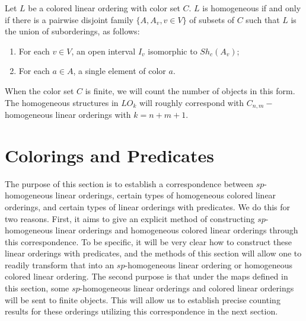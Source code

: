 \documentclass[11pt]{amsart}
\theoremstyle{definition}
\begin{document}
\begin{lemma}
Let $L$ be a colored linear ordering with color set $C$.
$L$ is homogeneous if and only if there is a pairwise disjoint family $\{A,A_v, v \in V\}$ of subsets of $C$ such that $L$ is the union of suborderings, as follows: 

\begin{enumerate}
\item For each $v \in V$, an open interval $I_v$ isomorphic to $Sh_c(A_v)$;

\item For each $a \in A$, a single element of color $a$.
\end{enumerate}
\end{lemma}

When the color set $C$ is finite, we will count the number of objects in this form.
The homogeneous structures in $LO_k$ will roughly correspond with $C_{n,m}-$homogeneous linear orderings with $k=n+m+1$.

\section{Colorings and Predicates}\label{sec:colorings}
The purpose of this section is to establish a correspondence between $sp$-homogeneous linear orderings, certain types of homogeneous colored linear orderings, and certain types of linear orderings with predicates.
We do this for two reasons.
First, it aims to give an explicit method of constructing $sp$-homogeneous linear orderings and homogeneous colored linear orderings through this correspondence.
To be specific, it will be very clear how to construct these linear orderings with predicates, and the methods of this section will allow one to readily transform that into an $sp$-homogeneous linear ordering or homogeneous colored linear ordering.
The second purpose is that under the maps defined in this section, some $sp$-homogeneous linear orderings and colored linear orderings will be sent to finite objects.
This will allow us to establish precise counting results for these orderings utilizing this correspondence in the next section.
\end{document}
